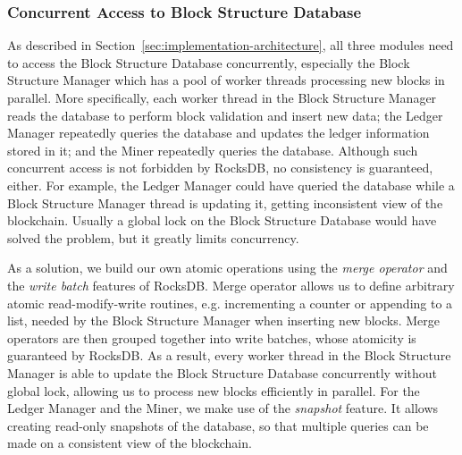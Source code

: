 \subsubsection{Concurrent Access to Block Structure Database}

As described in Section~\ref{sec:implementation-architecture}, all three modules need to access the Block Structure Database concurrently, especially the Block Structure Manager which has a pool of worker threads processing new blocks in parallel. More specifically, each worker thread in the Block Structure Manager reads the database to perform block validation and insert new data; the Ledger Manager repeatedly queries the database and updates the ledger information stored in it; and the Miner repeatedly queries the database. Although such concurrent access is not forbidden by RocksDB, no consistency is guaranteed, either. For example, the Ledger Manager could have queried the database while a Block Structure Manager thread is updating it, getting inconsistent view of the blockchain. Usually a global lock on the Block Structure Database would have solved the problem, but it greatly limits concurrency.

As a solution, we build our own atomic operations using the \textit{merge operator} and the \textit{write batch} features of RocksDB. Merge operator allows us to define arbitrary atomic read-modify-write routines, e.g. incrementing a counter or appending to a list, needed by the Block Structure Manager when inserting new blocks. Merge operators are then grouped together into write batches, whose atomicity is guaranteed by RocksDB. As a result, every worker thread in the Block Structure Manager is able to update the Block Structure Database concurrently without global lock, allowing us to process new blocks efficiently in parallel. For the Ledger Manager and the Miner, we make use of the \textit{snapshot} feature. It allows creating read-only snapshots of the database, so that multiple queries can be made on a consistent view of the blockchain. 




